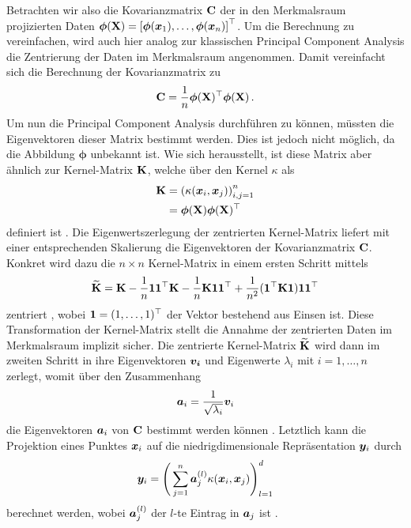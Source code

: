 Betrachten wir also die Kovarianzmatrix $\mathbf{C}$ der in den Merkmalsraum projizierten Daten
$\bm{\phi}(\mathbf{X}) = \left[ \bm{\phi}(\bm{x}_1), \ldots, \bm{\phi}(\bm{x}_n) \right]^\top$. Um
die Berechnung zu vereinfachen, wird auch hier analog zur klassischen Principal Component Analysis
die Zentrierung der Daten im Merkmalsraum angenommen. Damit vereinfacht sich die Berechnung der
Kovarianzmatrix zu
\begin{equation}
	\mathbf{C} = \frac{1}{n} \bm{\phi}(\mathbf{X})^\top \bm{\phi}(\mathbf{X}) \, .
\end{equation}
Um nun die Principal Component Analysis durchführen zu können, müssten die Eigenvektoren dieser Matrix bestimmt werden. Dies ist jedoch nicht möglich, da die Abbildung $\bm{\phi}$ unbekannt ist. Wie sich herausstellt, ist diese Matrix aber ähnlich zur Kernel-Matrix $\mathbf{K}$, welche über den Kernel $\kappa$ als
\begin{align}
	\mathbf{K} & = \left( \kappa(\bm{x}_i, \bm{x}_j) \right)_{i,j = 1}^n \label{eq:kPCA:KernelMatrix_A} \\
	        & = \bm{\phi}(\mathbf{X}) \bm{\phi}(\mathbf{X})^\top \label{eq:kPCA:KernelMatrix_B}
\end{align}
definiert ist \parencite[68]{ShaweTaylor.2011}. Die Eigenwertszerlegung der zentrierten Kernel-Matrix liefert mit
einer entsprechenden Skalierung die Eigenvektoren der Kovarianzmatrix $\mathbf{C}$. Konkret wird dazu
die $n \times n$ Kernel-Matrix in einem ersten Schritt mittels
\begin{equation}
	\label{eq:KernelCentering}
	\widetilde{\mathbf{K}} = \mathbf{K} - \frac{1}{n} \bm{1} \bm{1}^\top \mathbf{K} - \frac{1}{n} \mathbf{K} \bm{1} \bm{1}^\top + \frac{1}{n^2} (\bm{1}^\top \mathbf{K} \bm{1}) \bm{1} \bm{1}^\top
\end{equation}
zentriert \parencite[131]{ShaweTaylor.2011}, wobei $\bm{1} = (1, \ldots, 1)^\top$ der Vektor bestehend aus Einsen
ist. Diese Transformation der Kernel-Matrix stellt die Annahme der zentrierten Daten im
Merkmalsraum implizit sicher. Die zentrierte Kernel-Matrix $\widetilde{\mathbf{K}}$ wird dann im
zweiten Schritt in ihre Eigenvektoren $\bm{v_i}$ und Eigenwerte $\lambda_i$ mit $i = 1, \ldots,
	n$ zerlegt, womit über den Zusammenhang
\begin{equation}
	\label{eq:kPCA:ZusammenhangEigenvektoren}
	\bm{a}_i = \frac{1}{\sqrt{\lambda_i}} \bm{v}_i
\end{equation}
die Eigenvektoren $\bm{a}_i$ von $\mathbf{C}$ bestimmt werden können \parencite[142]{ShaweTaylor.2011}. Letztlich kann die Projektion eines Punktes $\bm{x}_i$ auf die
niedrigdimensionale Repräsentation $\bm{y}_i$ durch
\begin{equation}
	\bm{y}_i = \Bigg( \sum_{j=1}^n \bm{a}_j^{(l)} \kappa(\bm{x}_i, \bm{x}_j) \Bigg)_{l=1}^d
\end{equation}
berechnet werden, wobei $\bm{a}_j^{(l)}$ der $l$-te Eintrag in $\bm{a}_j$ ist \parencite[150]{ShaweTaylor.2011}.

